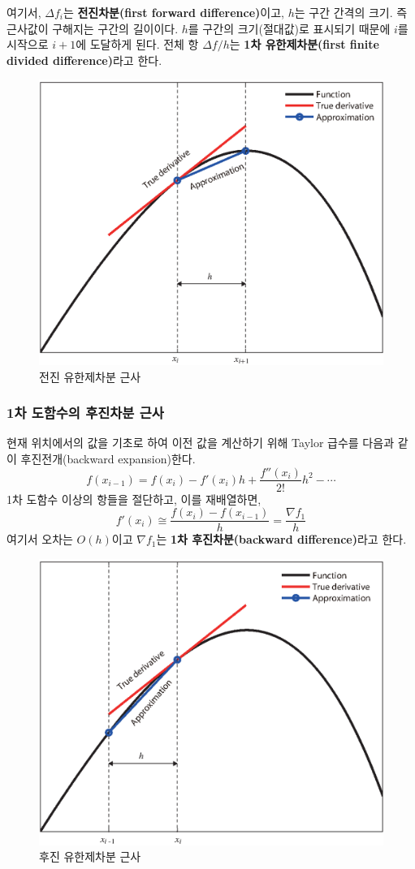 여기서, $\Delta f_{i}$는 \textbf{전진차분(first forward difference)}이고, $h$는 구간 간격의 크기. 즉 근사값이 구해지는 구간의 길이이다.
$h$를 구간의 크기(절대값)로 표시되기 때문에 $i$를 시작으로 $i+1$에 도달하게 된다. 전체 항 $\Delta f/h$는 \textbf{1차 유한제차분(first finite divided difference)}라고 한다.
\begin{figure}[!hbpt]
\centering
\includegraphics[keepaspectratio=true,width=0.5\linewidth]{figs/forward-deriv.eps}
\caption{전진 유한제차분 근사}
\label{fig:4-4a}
\end{figure}


\subsubsection{1차 도함수의 후진차분 근사}

현재 위치에서의 값을 기초로 하여 이전 값을 계산하기 위해 Taylor 급수를 다음과 같이 후진전개(backward expansion)한다.
\begin{equation}
f(x_{i-1})=f(x_i)-f'(x_i)h+\frac{f''(x_{i})}{2!}h^2-\cdots
\label{eq:4-19}
\end{equation}
1차 도함수 이상의 항들을 절단하고, 이를 재배열하면,
\begin{equation}\label{eq:4-backward}
f'(x_i) \cong \frac{f(x_i)-f(x_{i-1})}{h}= \frac{\nabla f_1}{h}
\end{equation}
여기서 오차는 $O(h)$이고 $\nabla f_1$는 \textbf{1차 후진차분(backward difference)}라고 한다.

\begin{figure}[!hbpt]
\centering
\includegraphics[keepaspectratio=true,width=0.5\linewidth]{figs/backward-deriv.eps}
\caption{후진 유한제차분 근사}
\label{fig:4-4b}
\end{figure}

